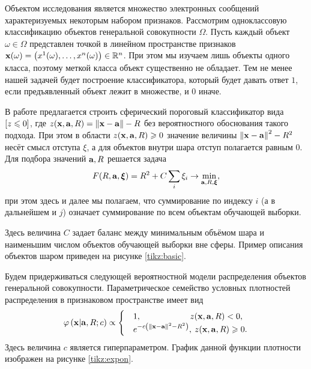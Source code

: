 Объектом исследования является множество электронных сообщений характеризуемых некоторым набором признаков.
Рассмотрим одноклассовую классификацию объектов генеральной совокупности $\Omega$.
Пусть каждый объект $\omega \in{\Omega}$  представлен точкой в линейном пространстве признаков
$\boldsymbol{\mathbf{x}}(\omega)=\left(x^1(\omega),\ldots, x^n(\omega)\right) \in {\mathbb R^n}$. При этом мы изучаем лишь объекты одного класса, поэтому меткой класса объект существенно не обладает.
Тем не менее нашей задачей будет построение классификатора, который будет давать ответ $1$, если предъявленный объект лежит в множестве, и $0$ иначе.

В работе \cite{Tax2001}  предлагается строить сферический пороговый классификатор вида
$\left[z \leqslant 0\right] $, где $z(\boldsymbol{\mathbf{x}},\boldsymbol{\mathbf{a}},R)=\left\|{\boldsymbol{\mathbf{x}}-\boldsymbol{\mathbf{a}}}\right\|-R$ без вероятностного обоснования такого подхода. При этом в области $z(\boldsymbol{\mathbf{x}}, \boldsymbol{\mathbf{a}}, R) \geqslant 0$ значение величины $\left\|{\boldsymbol{\mathbf{x}}-\boldsymbol{\mathbf{a}}}\right\|^2-R^2$ несёт смысл отступа $\xi$, а для объектов внутри шара отступ полагается равным 0. Для подбора значений $\boldsymbol{\mathbf{a}}, R$ решается задача
\begin{equation}
	\label{min:noprob}
	F(R,\boldsymbol{\mathbf{a}}, \boldsymbol{\mathbf{\xi}}) = R^2 + C\sum_i\xi_i \to \min_{\boldsymbol{\mathbf{a}}, R, \boldsymbol{\mathbf{\xi}}},
\end{equation}
при этом здесь и далее мы полагаем, что суммирование по индексу $i$ (а в дальнейшем и $j$) означает суммирование по всем объектам обучающей выборки.

Здесь величина $C$ задает баланс между минимальным объёмом шара и наименьшим числом объектов обучающей выборки вне сферы. Пример описания объектов шаром приведен на рисунке \ref{tikz:basic}.


Будем придерживаться следующей вероятностной модели распределения объектов генеральной совокупности.
Параметрическое семейство условных плотностей распределения в признаковом пространстве имеет вид
\begin{equation}
	\label{PhiXARC}
	\varphi \left( {\boldsymbol{\mathbf{x}} | \boldsymbol{\mathbf{a}},R;c} \right) \propto
		\begin{cases}
			&1, 		\qquad\qquad\qquad  	\! 	z(\boldsymbol{\mathbf{x}},\boldsymbol{\mathbf{a}},R) < 0, \\
			&e^{-c \left(\left\|{\boldsymbol{\mathbf{x}}-\boldsymbol{\mathbf{a}}}\right\|^2-R^2\right)}, 	\:	z(\boldsymbol{\mathbf{x}},\boldsymbol{\mathbf{a}},R) \geqslant 0.
		\end{cases}
\end{equation}
Здесь величина $c$ является гиперпараметром. График данной функции плотности изображен на рисунке \ref{tikz:expon}.


